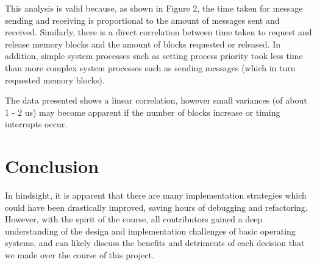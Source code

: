 \documentclass[11pt, oneside]{article}
\begin{document}
This analysis is valid because, as shown in Figure 2, the time taken for message sending and receiving is proportional to the amount of messages sent and received. Similarly, there is a direct correlation between time taken to request and release memory blocks and the amount of blocks requested or released. In addition, simple system processes such as setting process priority took less time than more complex system processes such as sending messages (which in turn requested memory blocks).

The data presented shows a linear correlation, however small variances (of about 1 - 2 us) may become apparent if the number of blocks increase or timing interrupts occur.

\section{Conclusion}
In hindsight, it is apparent that there are many implementation strategies which could have been drastically improved, saving hours of debugging and refactoring. However, with the spirit of the course, all contributors gained a deep understanding of the design and implementation challenges of basic operating systems, and can likely discuss the benefits and detriments of each decision that we made over the course of this project.
\end{document}
